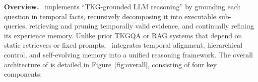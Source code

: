 


\noindent\textbf{Overview.}
\mot\ implements ``TKG-grounded LLM reasoning'' by grounding each question in temporal facts, recursively decomposing it into executable sub-queries, retrieving and pruning temporally valid evidence, and continually refining its experience memory. 
Unlike prior TKGQA or RAG systems that depend on static retrievers or fixed prompts, \mot\ integrates temporal alignment, hierarchical control, and self-evolving memory into a unified reasoning framework. 
The overall architecture of \mot is detailed in Figure~\ref{fig:overall}, consisting of four key components:


